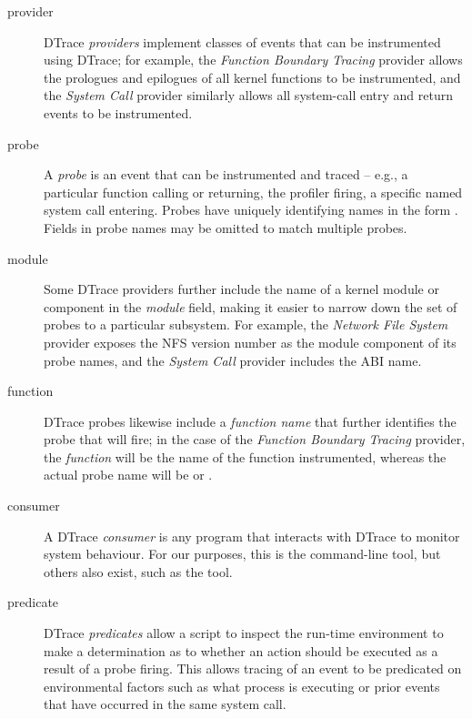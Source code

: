 \documentclass[a4paper,10pt]{article}
\begin{document}
\begin{description}
\item[provider] DTrace \textit{providers} implement classes of events that can
  be instrumented using DTrace; for example, the \textit{Function Boundary
  Tracing} provider allows the prologues and epilogues of all kernel functions
  to be instrumented, and the \textit{System Call} provider similarly allows
  all system-call entry and return events to be instrumented.

\item[probe] A \textit{probe} is an event that can be instrumented and traced
  -- e.g., a particular function calling or returning, the profiler firing, a
  specific named system call entering.
  Probes have uniquely identifying names in the form
  .
  Fields in probe names may be omitted to match multiple probes.

\item[module] Some DTrace providers further include the name of a kernel
  module or component in the \textit{module} field, making it easier to narrow
  down the set of probes to a particular subsystem.
  For example, the \textit{Network File System} provider exposes the NFS
  version number as the module component of its probe names, and the
  \textit{System Call} provider includes the ABI name.

\item[function] DTrace probes likewise include a \textit{function name} that
  further identifies the probe that will fire; in the case of the
  \textit{Function Boundary Tracing} provider, the \textit{function} will be
  the name of the function instrumented, whereas the actual probe name will be
   or .

\item[consumer] A DTrace \textit{consumer} is any program that interacts with
  DTrace to monitor system behaviour.
  For our purposes, this is the  command-line tool, but others
  also exist, such as the  tool.

\item[predicate] DTrace \textit{predicates} allow a script to inspect the
  run-time environment to make a determination as to whether an action should
  be executed as a result of a probe firing.
  This allows tracing of an event to be predicated on environmental factors
  such as what process is executing or prior events that have occurred in the
  same system call.


\end{description}
\end{document}
